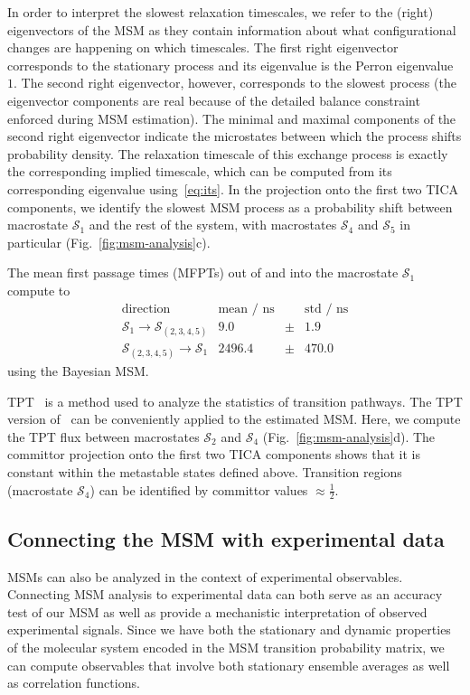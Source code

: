 \documentclass[9pt,tutorial]{livecoms}
\begin{document}
In order to interpret the slowest relaxation timescales, we refer to the (right) eigenvectors of the MSM as they contain information about what configurational changes are happening on which timescales.
The first right eigenvector corresponds to the stationary process and its eigenvalue is the Perron eigenvalue $1$.
The second right eigenvector, however, corresponds to the slowest process 
(the eigenvector components are real because of the detailed balance constraint enforced during MSM estimation).
The minimal and maximal components of the second right eigenvector indicate the microstates between which the process shifts probability density.
The relaxation timescale of this exchange process is exactly the corresponding implied timescale, which can be computed from its corresponding eigenvalue using~\eqref{eq:its}.
In the projection onto the first two TICA components, we identify the slowest MSM process as a probability shift between macrostate $\mathcal{S}_1$ and the rest of the system, with macrostates $\mathcal{S}_4$ and $\mathcal{S}_5$ in particular (Fig.~\ref{fig:msm-analysis}c).

The mean first passage times (MFPTs) out of and into the macrostate $\mathcal{S}_1$ compute to
\[ \begin{array}{crcr}
\textrm{direction} & \textrm{mean / ns} && \textrm{std / ns} \\
\hline
\mathcal{S}_1 \to \mathcal{S}_{(2,3,4,5)} & 9.0 & \pm & 1.9 \\
\mathcal{S}_{(2,3,4,5)} \to \mathcal{S}_1 & 2496.4 & \pm &  470.0
\end{array}\]
using the Bayesian MSM.

TPT~\cite{weinan-tpt,metzner-msm-tpt} is a method used to analyze the statistics of transition pathways. The TPT version of~\cite{noe-folding-pathways} can be conveniently applied to the estimated MSM. Here, we compute the TPT flux between macrostates $\mathcal{S}_2$ and $\mathcal{S}_4$ (Fig.~\ref{fig:msm-analysis}d).
The committor projection onto the first two TICA components shows that it is constant within the metastable states defined above.
Transition regions (macrostate $\mathcal{S}_4$) can be identified by committor values $\approx \frac{1}{2}$.

\subsection{Connecting the MSM with experimental data}
MSMs can also be analyzed in the context of experimental observables. Connecting MSM analysis to experimental data can both serve as an accuracy test of our MSM as well as provide a mechanistic interpretation of observed experimental signals.
Since we have both the stationary and dynamic properties of the molecular system encoded in the MSM transition probability matrix, we can compute observables that involve both stationary ensemble averages as well as correlation functions.
\end{document}

